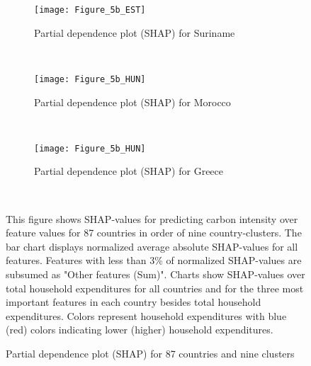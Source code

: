 \begin{figure}[ht!]\ContinuedFloat
    \centering
   \begin{subfigure}[b]{\textwidth}
         \centering
         \caption{Partial dependence plot (SHAP) for Suriname}
         \label{fig:5b_SUR}
         \texttt{[image: Figure\_5b\_EST]}         
     \end{subfigure}
    \\
    \vspace{0.5cm}
   \begin{subfigure}[b]{\textwidth}
         \centering
         \caption{Partial dependence plot (SHAP) for Morocco}
         \label{fig:5b_MAR}
         \texttt{[image: Figure\_5b\_HUN]}         
     \end{subfigure}
    \\
    \vspace{0.5cm}
   \begin{subfigure}[b]{\textwidth}
         \centering
         \caption{Partial dependence plot (SHAP) for Greece}
         \label{fig:5b_GRC}
         \texttt{[image: Figure\_5b\_HUN]}
    \end{subfigure}
    \\
    \vspace{0.5cm}
        \caption{Partial dependence plot (SHAP) for 87 countries and nine clusters}
        \label{fig:5b}
    \begin{subcaption2}
     This figure shows SHAP-values for predicting carbon intensity over feature values for 87 countries in order of nine country-clusters. The bar chart displays normalized average absolute SHAP-values for all features. Features with less than 3\% of normalized SHAP-values are subsumed as "Other features (Sum)". Charts show SHAP-values over total household expenditures for all countries and for the three most important features in each country besides total household expenditures. Colors represent household expenditures with blue (red) colors indicating lower (higher) household expenditures.
     \end{subcaption2}
\end{figure}